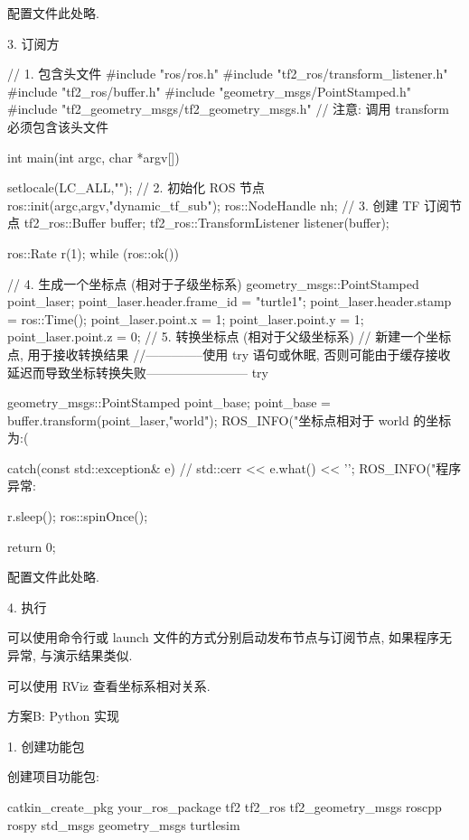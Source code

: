 \documentclass[openany, fontset=windowsold]{ctexbook}
\theoremstyle{kaiti}
\theoremstyle{normal}
\begin{document}
配置文件此处略.

3. 订阅方

\begin{cpp}
  // 1. 包含头文件
  #include "ros/ros.h"
  #include "tf2_ros/transform_listener.h"
  #include "tf2_ros/buffer.h"
  #include "geometry_msgs/PointStamped.h"
  #include "tf2_geometry_msgs/tf2_geometry_msgs.h" // 注意: 调用 transform 必须包含该头文件

  int main(int argc, char *argv[])
  {
      setlocale(LC_ALL,"");
      // 2. 初始化 ROS 节点
      ros::init(argc,argv,"dynamic_tf_sub");
      ros::NodeHandle nh;
      // 3. 创建 TF 订阅节点
      tf2_ros::Buffer buffer;
      tf2_ros::TransformListener listener(buffer);

      ros::Rate r(1);
      while (ros::ok())
      {
      // 4. 生成一个坐标点 (相对于子级坐标系)
          geometry_msgs::PointStamped point_laser;
          point_laser.header.frame_id = "turtle1";
          point_laser.header.stamp = ros::Time();
          point_laser.point.x = 1;
          point_laser.point.y = 1;
          point_laser.point.z = 0;
      // 5. 转换坐标点 (相对于父级坐标系)
          // 新建一个坐标点, 用于接收转换结果  
          //--------------使用 try 语句或休眠, 否则可能由于缓存接收延迟而导致坐标转换失败------------------------
          try
          {
              geometry_msgs::PointStamped point_base;
              point_base = buffer.transform(point_laser,"world");
              ROS_INFO("坐标点相对于 world 的坐标为:(%

          }
          catch(const std::exception& e)
          {
              // std::cerr << e.what() << '\n';
              ROS_INFO("程序异常:%
          }

          r.sleep();  
          ros::spinOnce();
      }

      return 0;
  }
\end{cpp}

配置文件此处略.

4. 执行

可以使用命令行或 launch 文件的方式分别启动发布节点与订阅节点, 如果程序无异常, 与演示结果类似.

可以使用 RViz 查看坐标系相对关系.

方案B: Python 实现

1. 创建功能包

创建项目功能包:

\begin{bash}
  catkin_create_pkg your_ros_package tf2 tf2_ros tf2_geometry_msgs roscpp rospy std_msgs geometry_msgs turtlesim
\end{bash}
\end{document}
